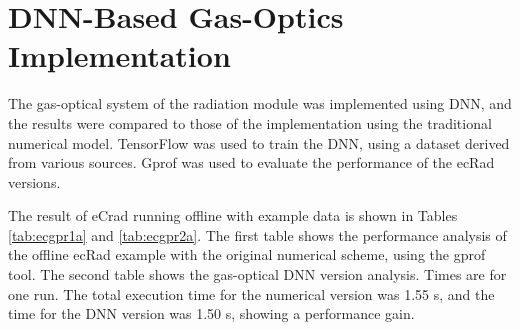 





\FloatBarrier

\section{DNN-Based Gas-Optics Implementation}
\label{sec:resu32}

The gas-optical system of the radiation module was implemented using DNN, and the results were compared to those of the implementation using the traditional numerical model. TensorFlow was used to train the DNN, using a dataset derived from various sources. Gprof was used to evaluate the performance of the ecRad versions.



The result of eCrad running offline with example data is shown in Tables \ref{tab:ecgpr1a} and \ref{tab:ecgpr2a}.
The first table shows the performance analysis of the offline ecRad example with the original numerical scheme, using the gprof tool.
The second table shows the gas-optical DNN version analysis. 
Times are for one run.
The total execution time for the numerical version was 1.55 s, and the time for the DNN version was 1.50 s, showing a performance gain.

